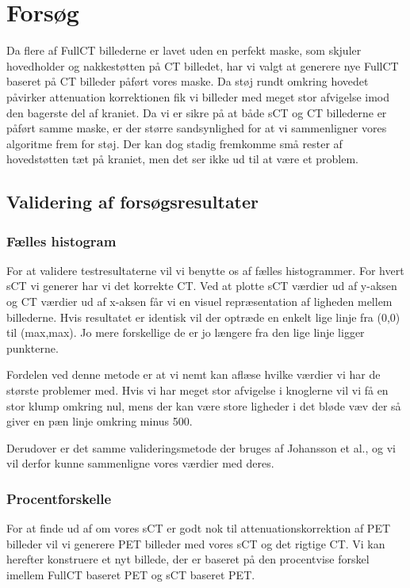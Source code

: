 \section{Forsøg}

Da flere af FullCT billederne er lavet uden en perfekt maske, som skjuler hovedholder og nakkestøtten på CT billedet, har vi valgt at generere nye FullCT baseret på CT billeder påført vores maske. Da støj rundt omkring hovedet påvirker attenuation korrektionen fik vi billeder med meget stor afvigelse imod den bagerste del af kraniet. Da vi er sikre på at både sCT og CT billederne er påført samme maske, er der større sandsynlighed for at vi sammenligner vores algoritme frem for støj. Der kan dog stadig fremkomme små rester af hovedstøtten tæt på kraniet, men det ser ikke ud til at være et problem.

\subsection{Validering af forsøgsresultater}

\subsubsection{Fælles histogram}

For at validere testresultaterne vil vi benytte os af fælles histogrammer. For hvert sCT vi generer har vi det korrekte CT. Ved at plotte sCT værdier ud af y-aksen og CT værdier ud af x-aksen får vi en visuel repræsentation af ligheden mellem billederne. Hvis resultatet er identisk vil der optræde en enkelt lige linje fra (0,0) til (max,max). Jo mere forskellige de er jo længere fra den lige linje ligger punkterne.

Fordelen ved denne metode er at vi nemt kan aflæse hvilke værdier vi har de største problemer med. Hvis vi har meget stor afvigelse i knoglerne vil vi få en stor klump omkring nul, mens der kan være store ligheder i det bløde væv der så giver en pæn linje omkring minus 500.

Derudover er det samme valideringsmetode der bruges af Johansson et al., og vi vil derfor kunne sammenligne vores værdier med deres.

\subsubsection{Procentforskelle}

For at finde ud af om vores sCT er godt nok til attenuationskorrektion af PET billeder vil vi generere PET billeder med vores sCT og det rigtige CT. Vi kan herefter konstruere et nyt billede, der er baseret på den procentvise forskel imellem FullCT baseret PET og sCT baseret PET. 

